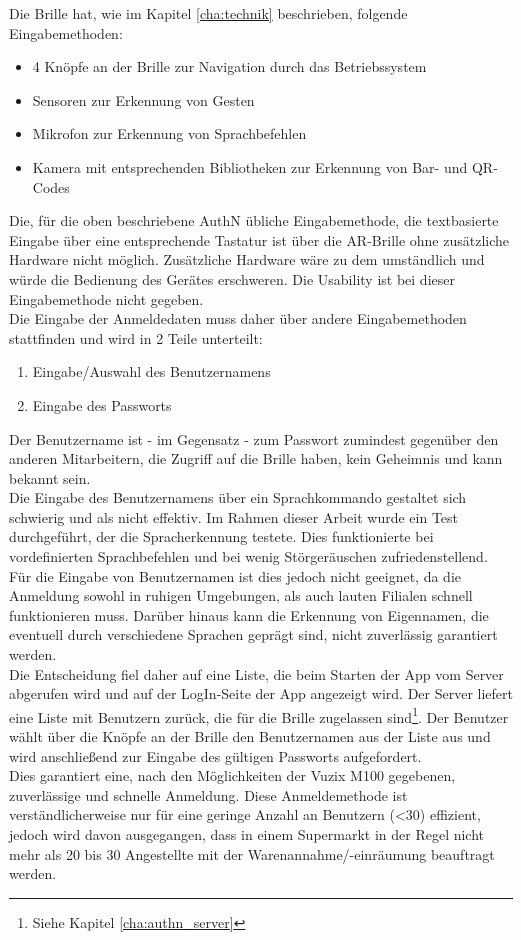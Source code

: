 Die Brille hat, wie im Kapitel \ref{cha:technik} beschrieben, folgende Eingabemethoden:
\begin{itemize}
	\item 4 Knöpfe an der Brille zur Navigation durch das Betriebssystem
	\item Sensoren zur Erkennung von Gesten
	\item Mikrofon zur Erkennung von Sprachbefehlen
	\item Kamera mit entsprechenden Bibliotheken zur Erkennung von Bar- und QR-Codes
\end{itemize}
Die, für die oben beschriebene \acf{AuthN} übliche Eingabemethode, die textbasierte Eingabe über eine entsprechende Tastatur ist über die \ac{AR}-Brille ohne zusätzliche Hardware nicht möglich. Zusätzliche Hardware wäre zu dem umständlich und würde die Bedienung des Gerätes erschweren. Die Usability ist bei dieser Eingabemethode nicht gegeben.\\

Die Eingabe der Anmeldedaten muss daher über andere Eingabemethoden stattfinden und wird in 2 Teile unterteilt:
\begin{enumerate}
	\item Eingabe/Auswahl des Benutzernamens
	\item Eingabe des Passworts
\end{enumerate}

Der Benutzername ist - im Gegensatz - zum Passwort zumindest gegenüber den anderen Mitarbeitern, die Zugriff auf die Brille haben, kein Geheimnis und kann bekannt sein.\\
Die Eingabe des Benutzernamens über ein Sprachkommando gestaltet sich schwierig und als nicht effektiv. Im Rahmen dieser Arbeit wurde ein Test durchgeführt, der die Spracherkennung testete. Dies funktionierte bei vordefinierten Sprachbefehlen und bei wenig Störgeräuschen zufriedenstellend. Für die Eingabe von Benutzernamen ist dies jedoch nicht geeignet, da die Anmeldung sowohl in ruhigen Umgebungen, als auch lauten Filialen schnell funktionieren muss. Darüber hinaus kann die Erkennung von Eigennamen, die eventuell durch verschiedene Sprachen geprägt sind, nicht zuverlässig garantiert werden.\\
Die Entscheidung fiel daher auf eine Liste, die beim Starten der App vom Server abgerufen wird und auf der LogIn-Seite der App angezeigt wird. Der Server liefert eine Liste mit Benutzern zurück, die für die Brille zugelassen sind\footnote{Siehe Kapitel \ref{cha:authn_server} }. Der Benutzer wählt über die Knöpfe an der Brille den Benutzernamen aus der Liste aus und wird anschließend zur Eingabe des gültigen Passworts aufgefordert.\\
Dies garantiert eine, nach den Möglichkeiten der Vuzix M100 gegebenen, zuverlässige und schnelle Anmeldung. Diese Anmeldemethode ist verständlicherweise nur für eine geringe Anzahl an Benutzern (<30) effizient, jedoch wird davon ausgegangen, dass in einem Supermarkt in der Regel nicht mehr als 20 bis 30 Angestellte mit der Warenannahme/-einräumung beauftragt werden.\\

